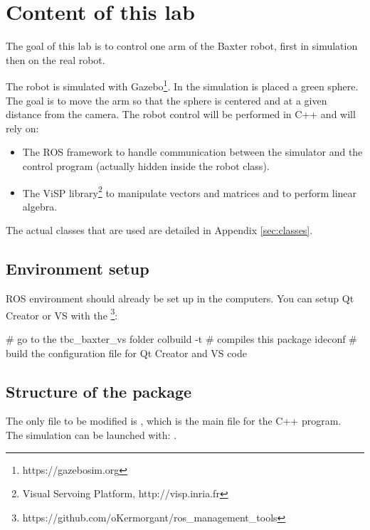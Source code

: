 \documentclass{ecnreport}
\begin{document}


\section{Content of this lab}

The goal of this lab is to control one arm of the Baxter robot, first in simulation then on the real robot.

The robot is simulated with Gazebo\footnote{https://gazebosim.org}.
In the simulation is placed a green sphere. The goal is to move the arm so that the sphere is centered and at a given distance from the camera.
The robot control will be performed in C++ and will rely on:

\begin{itemize}
 \item The ROS framework to handle communication between the simulator and the control program (actually hidden inside the robot class).
 \item The ViSP library\footnote{Visual Servoing Platform, http://visp.inria.fr} to manipulate vectors and matrices and to perform linear algebra.
\end{itemize}
The actual classes that are used are detailed in Appendix \ref{sec:classes}.\\

\subsection{Environment setup}

ROS environment should already be set up in the computers. You can setup Qt Creator or VS with the \footnote{https://github.com/oKermorgant/ros\_management\_tools}:

\begin{bashcodelarge}
 # go to the tbc_baxter_vs folder
 colbuild -t # compiles this package
 ideconf # build the configuration file for Qt Creator and VS code
\end{bashcodelarge}

\subsection{Structure of the  package}

The only file to be modified is , which is the main file for the C++ program. \\
The simulation can be launched with: .
\end{document}
